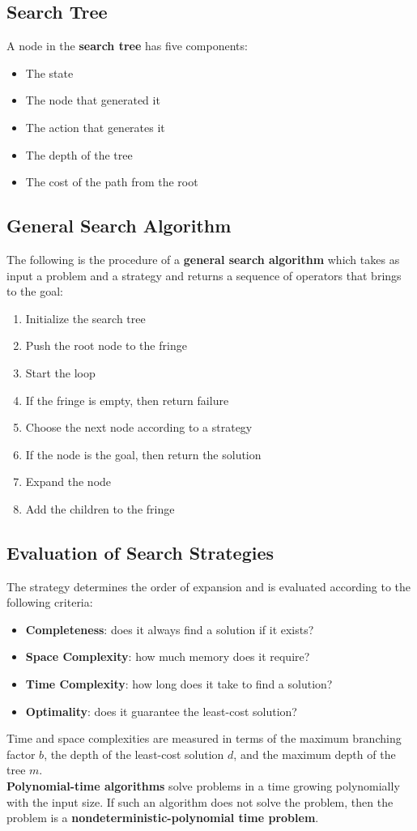 \documentclass{article}
\begin{document}
\subsection{Search Tree}
A node in the \textbf{search tree} has five components:
\begin{itemize}
    \item The state
    \item The node that generated it
    \item The action that generates it
    \item The depth of the tree
    \item The cost of the path from the root
\end{itemize} 
\subsection{General Search Algorithm}
The following is the procedure of a \textbf{general search algorithm} which takes as input a problem and a strategy and returns a sequence of operators that brings to the goal:
\begin{enumerate}
    \item Initialize the search tree
    \item Push the root node to the fringe
    \item Start the loop
    \item If the fringe is empty, then return failure
    \item Choose the next node according to a strategy
    \item If the node is the goal, then return the solution
    \item Expand the node 
    \item Add the children to the fringe
\end{enumerate}
\subsection{Evaluation of Search Strategies}
The strategy determines the order of expansion and is evaluated according to the following criteria:
\begin{itemize}
    \item \textbf{Completeness}: does it always find a solution if it exists?
    \item \textbf{Space Complexity}: how much memory does it require?
    \item \textbf{Time Complexity}: how long does it take to find a solution?
    \item \textbf{Optimality}: does it guarantee the least-cost solution?
\end{itemize}
Time and space complexities are measured in terms of the maximum branching factor $b$, the depth of the least-cost solution $d$, and the maximum depth of the tree $m$. \\
\textbf{Polynomial-time algorithms} solve problems in a time growing polynomially with the input size. If such an algorithm does not solve the problem, then the problem is a \textbf{nondeterministic-polynomial time problem}.
\end{document}
